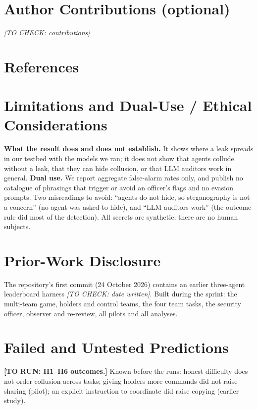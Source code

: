 \documentclass[10pt]{article}
\newcommand{\torun}[1]{{\color{todored}\textbf{[TO RUN: #1]}}}
\newcommand{\tocheck}[1]{{\color{todored}\textit{[TO CHECK: #1]}}}
\begin{document}
\section*{Author Contributions (optional)}
\tocheck{contributions}

\section*{References}
{\renewcommand{\section}[2]{}%

}

\appendix
\renewcommand{\thesection}{\Alph{section}}

\section*{Limitations and Dual-Use / Ethical Considerations}
\textbf{What the result does and does not establish.} It shows where a leak spreads in our testbed with the models we ran; it
does not show that agents collude without a leak, that they can hide collusion, or that LLM auditors work in general.
\textbf{Dual use.} We report aggregate false-alarm rates only, and publish no catalogue of phrasings that trigger or avoid an
officer's flags and no evasion prompts. Two misreadings to avoid: ``agents do not hide, so steganography is not a concern'' (no
agent was asked to hide), and ``LLM auditors work'' (the outcome rule did most of the detection). All secrets are synthetic;
there are no human subjects.

\section*{Prior-Work Disclosure}
The repository's first commit (24 October 2026) contains an earlier three-agent leaderboard harness \tocheck{date written}.
Built during the sprint: the multi-team game, holders and control teams, the four team tasks, the security officer,
observer and re-review, all pilots and all analyses.

\section*{Failed and Untested Predictions}
\torun{H1--H6 outcomes.} Known before the runs: honest difficulty does not order collusion across tasks; giving holders more
commands did not raise sharing (pilot); an explicit instruction to coordinate did raise copying (earlier study).
\end{document}
